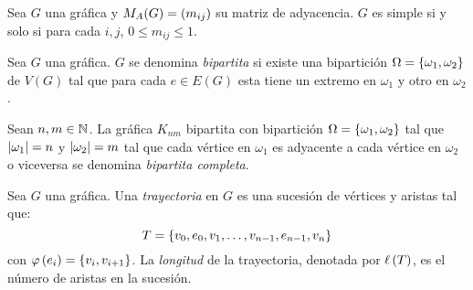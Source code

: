 \begin{theorem}
	Sea $G$ una gráfica y $M_{A}(G) =\left( m_{ij} \right)$ su matriz de adyacencia. $G$ es simple si y solo si para cada $i, j$, $0\leq m_{ij}\leq 1$.
\end{theorem}
\begin{definition}
	Sea $G$ una gráfica. $G$ se denomina \emph{bipartita} si existe una bipartición $\Omega =\left\{ \omega_{1},\omega_{2} \right\}$ de $V(G)$ tal que para cada $e\in E(G)$ esta tiene un extremo en $\omega_{1}$ y otro en $\omega_{2}$.
\end{definition}
\begin{figure}[H]
	\centering
\end{figure}
\begin{definition}
	Sean $n, m\in\mathbb{N}^{}$. La gráfica $K_{nm}$ bipartita con bipartición $\Omega =\left\{ \omega_{1},\omega_{2} \right\}$ tal que $\left\vert \omega_{1} \right\vert = n$ y $\left\vert \omega_{2} \right\vert = m$ tal que cada vértice en $\omega_{1}$ es adyacente a cada vértice en $\omega_{2}$ o viceversa se denomina \emph{bipartita completa}.
\end{definition}
\begin{figure}[H]
	\centering
\end{figure}
\begin{definition}[Trayectoria]
	Sea $G$ una gráfica. Una \emph{trayectoria} en $G$ es una sucesión de vértices y aristas tal que:
	\[ T =\left\{ v_{0}, e_{0}, v_{1},\dotsc, v_{n - 1}, e_{n - 1}, v_{n} \right\} \]
	con $\varphi\left( e_{i} \right) =\left\{ v_{i}, v_{i + 1} \right\}$. La \emph{longitud} de la trayectoria, denotada por $\mleng{T}$, es el número de aristas en la sucesión.
\end{definition}
\begin{figure}[H]
	\centering
\end{figure}
